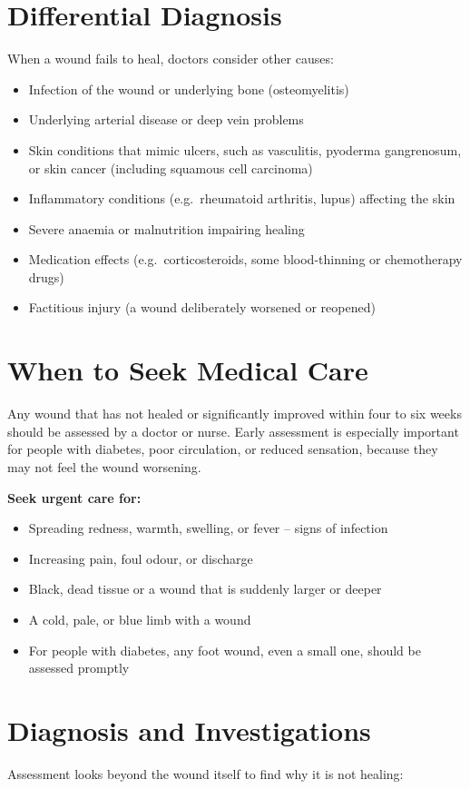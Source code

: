 \section*{Differential Diagnosis}
When a wound fails to heal, doctors consider other causes:

\begin{itemize}
    \item Infection of the wound or underlying bone (osteomyelitis)
    \item Underlying arterial disease or deep vein problems
    \item Skin conditions that mimic ulcers, such as vasculitis, pyoderma gangrenosum, or skin cancer (including squamous cell carcinoma)
    \item Inflammatory conditions (e.g.\ rheumatoid arthritis, lupus) affecting the skin
    \item Severe anaemia or malnutrition impairing healing
    \item Medication effects (e.g.\ corticosteroids, some blood-thinning or chemotherapy drugs)
    \item Factitious injury (a wound deliberately worsened or reopened)
\end{itemize}

\section*{When to Seek Medical Care}
Any wound that has not healed or significantly improved within four to six weeks should be assessed by a doctor or nurse. Early assessment is especially important for people with diabetes, poor circulation, or reduced sensation, because they may not feel the wound worsening.

\textbf{Seek urgent care for:}
\begin{itemize}
    \item Spreading redness, warmth, swelling, or fever -- signs of infection
    \item Increasing pain, foul odour, or discharge
    \item Black, dead tissue or a wound that is suddenly larger or deeper
    \item A cold, pale, or blue limb with a wound
    \item For people with diabetes, any foot wound, even a small one, should be assessed promptly
\end{itemize}

\section*{Diagnosis and Investigations}
Assessment looks beyond the wound itself to find why it is not healing:

